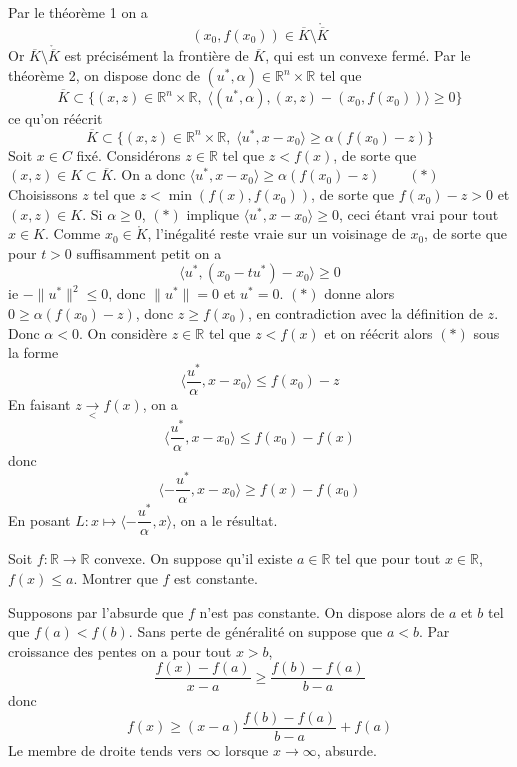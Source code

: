 \documentclass{fancybook}
\begin{document}
Par le théorème 1 on a $$(x_0,f(x_0))\in \overline K \setminus\mathring{\overline K}$$
Or $\overline K \setminus\mathring{\overline K}$ est précisément la frontière de $\overline K$, qui est un convexe fermé.\newline
Par le théorème 2, on dispose donc de $(u^*,\alpha)\in \mathbb R^n\times\mathbb  R$ tel que 
$$\overline K \subset \{(x,z)\in \mathbb R^n\times \mathbb R, \; \langle (u^*,\alpha), (x,z)-(x_0,f(x_0)) \rangle \geq 0 \} $$
ce qu'on réécrit 
$$ \overline K \subset \{(x,z)\in \mathbb R^n\times \mathbb R, \; \langle u^*, x-x_0 \rangle \geq \alpha(f(x_0)-z) \} $$
Soit $x\in C$ fixé. Considérons $z\in \mathbb R$ tel que $z<f(x)$, de sorte que $(x,z)\in K\subset \overline K$.\newline
On a donc $\langle u^*, x-x_0 \rangle \geq \alpha(f(x_0)-z) \quad \quad(*)$\newline
Choisissons $z$ tel que $z<\min(f(x),f(x_0))$, de sorte que $f(x_0)-z>0$ et $(x,z)\in K$.\newline \newline
Si $\alpha \geq 0$, $(*)$ implique $\langle u^*, x-x_0 \rangle \geq 0$, ceci étant vrai pour tout $x\in K$.\newline
Comme $x_0\in \mathring K$, l'inégalité reste vraie sur un voisinage de $x_0$, de sorte que pour $t>0$ suffisamment petit on a 
$$ \langle u^*, (x_0-tu^*)-x_0 \rangle \geq 0$$
ie $-\|u^*\|^2\leq0$, donc $\|u^*\|=0$ et $u^*=0$. \newline
$(*)$ donne alors $0\geq \alpha(f(x_0)-z)$, donc $z\geq f(x_0)$, en contradiction avec la définition de $z$.\newline 
\newline
Donc $\alpha <0$. On considère $z\in \mathbb R$ tel que $z<f(x)$ et on réécrit alors $(*)$ sous la forme $$\langle \dfrac{u^*}{\alpha} ,x-x_0\rangle \leq f(x_0) -z$$
En faisant $z\xrightarrow[<]{}f(x)$, on a $$\langle \dfrac{u^*}{\alpha} ,x-x_0\rangle \leq f(x_0) -f(x)$$ donc 
$$\langle -\dfrac{u^*}{\alpha} ,x-x_0\rangle \geq f(x) -f(x_0)$$
En posant $L:x\mapsto \langle -\dfrac{u^*}{\alpha} ,x\rangle$, on a le résultat.

\begin{exercice}
Soit $f:\mathbb R\to \mathbb R$ convexe. On suppose qu'il existe $a\in \mathbb R$ tel que pour tout $x\in \mathbb R$, $f(x)\leq a$. Montrer que $f$ est constante.
\end{exercice}
Supposons par l'absurde que $f$ n'est pas constante. On dispose alors de $a$ et $b$ tel que $f(a)< f(b)$. Sans perte de généralité on suppose que $a<b$. Par croissance des pentes on a pour tout $x>b$, $$\dfrac{f(x)-f(a)}{x-a} \geq \dfrac{f(b)-f(a)}{b-a}$$
donc 
$$f(x)\geq (x-a)\dfrac{f(b)-f(a)}{b-a} + f(a)$$
Le membre de droite tends vers $\infty$ lorsque $x\to \infty$, absurde.
\end{document}
